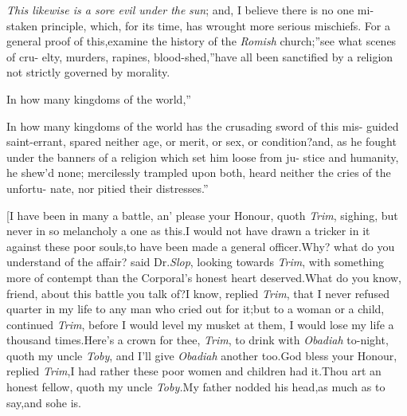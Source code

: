 \documentclass{article}
\begin{document}
\lqq \textit{This likewise is a sore evil under the}\break
\lqq \textit{sun}; and, I believe there is no one mi-\break
\lqq staken principle, which, for its time,\break
\lqq has wrought more serious mischiefs.\tsh\break
\lqq For a general proof of this,\tsk examine\break
\lqq the history of the \textit{Romish} church;”\tsk{}\tsk \lqq see what scenes of cru-\break
\lqq elty, murders, rapines, blood-shed,” \lqq have all been sanctified\break
\lqq by a religion not strictly governed by\break
\lqq morality.\\
\newpage

\lqq In how many kingdoms of the world,”

\lqq In how many kingdoms of the world\break
\lqq has the crusading sword of this mis-\break
\lqq guided saint-errant, spared neither age,\break
\lqq or merit, or sex, or condition?\tsk and,\break
\lqq as he fought under the banners of a\break
\lqq religion which set him loose from ju-\break
\lqq stice and humanity, he shew’d none;\break
\lqq mercilessly trampled upon both,\tsh\break
\lqq heard neither the cries of the unfortu-\break
\lqq nate, nor pitied their distresses.”

[I have been in many a battle, an’ please your Honour, quoth \textit{Trim},
sighing, but never in so melancholy a one as this.\tsk I would not have drawn
a tricker
in it against these poor souls,\tsh to have been made a general
officer.\tsh\break Why? what do you understand of the affair?
said Dr.\@ \textit{Slop}, looking towards \textit{Trim}, with
something more of contempt than the Corporal’s honest heart
deserved.\tsh\break What do you know, friend, about this battle
you talk of?\tsh I know, replied \textit{Trim}, that I never
refused quarter in my life to any man who cried out for
it;\tsh\break but to a woman or a child, continued
\textit{Trim}, before I would level my musket at them, I would
lose my life a thousand times.\tsk Here’s a crown for thee,
\textit{Trim}, to drink with \textit{Obadiah} to-night, quoth my
uncle \textit{Toby}, and I’ll give \textit{Obadiah} another
too.\tsk God bless your Honour, replied \textit{Trim},\tsh I had
rather these poor women and children had it.\tsh\break Thou art
an honest fellow, quoth my\break
uncle \textit{Toby.}\tsh My father
nodded his 
head,\tsh as much as to say,\tsh and so\break he is.\tsh
\end{document}
